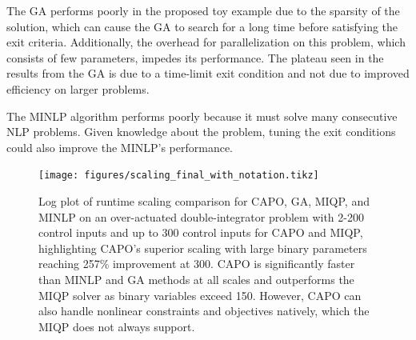 \documentclass[runningheads]{llncs}
\begin{document}
The GA performs poorly in the proposed toy example due to the sparsity of the solution, which can cause the GA to search for a long time before satisfying the exit criteria. Additionally, the overhead for parallelization on this problem, which consists of few parameters, impedes its performance. The plateau seen in the results from the GA is due to a time-limit exit condition and not due to improved efficiency on larger problems.

The MINLP algorithm performs poorly because it must solve many consecutive NLP problems. Given knowledge about the problem, tuning the exit conditions could also improve the MINLP's performance. 



\begin{figure}
    \centering
    \texttt{[image: figures/scaling\_final\_with\_notation.tikz]}
    \vspace{-10pt}
    \caption{Log plot of runtime scaling comparison for CAPO, GA, MIQP, and MINLP on an over-actuated double-integrator problem with 2-200 control inputs and up to 300 control inputs for CAPO and MIQP, highlighting CAPO's superior scaling with large binary parameters reaching 257\% improvement at 300. CAPO is significantly faster than MINLP and GA methods at all scales and outperforms the MIQP solver as binary variables exceed 150. However, CAPO can also handle nonlinear constraints and objectives natively, which the MIQP does not always support.}
    \label{fig:time_scaling}
    \vspace{-25pt}

\end{figure}

\vspace{-10pt}
\end{document}
